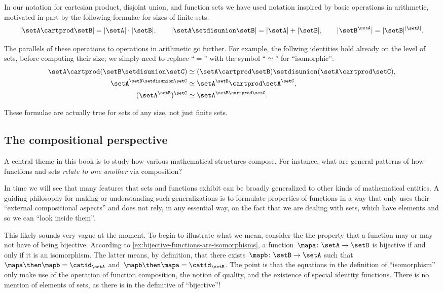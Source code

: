 In our notation for cartesian product, disjoint union, and function sets we have used notation inspired by basic operations in arithmetic, motivated in part by the following formulae for sizes of finite sets:
\begin{equation*}
    \vert \setA \cartprod \setB \vert = \vert \setA \vert \cdot \vert \setB \vert, \qquad \vert \setA \setdisunion \setB \vert = \vert \setA \vert + \vert \setB \vert, \qquad \vert \setB^{\setA} \vert = \vert \setB \vert^{\vert \setA \vert}.
\end{equation*}

The parallels of these operations to operations in arithmetic go further.
For example, the follwing identities hold already on the level of sets, before computing their size; we simply need to replace ``$=$'' with the symbol ``$\simeq$'' for ``isomorphic'':
\begin{align*}
    \setA \cartprod (\setB \setdisunion \setC) & \simeq (\setA \cartprod \setB) \setdisunion (\setA \cartprod \setC), \\
    \setA^{\setB \setdisunion \setC}           & \simeq \setA^\setB \cartprod \setA^\setC, \\
    (\setA^\setB)^\setC                        & \simeq \setA^{\setB \cartprod \setC}.
\end{align*}

These formulae are actually true for sets of any size, not just finite sets.

\subsection{The compositional perspective}

A central theme in this book is to study how various mathematical structures compose.
For instance, what are general patterns of how functions and sets \emph{relate to one another} via composition?

In time we will see that many features that sets and functions exhibit can be broadly generalized to other kinds of mathematical entities.
A guiding philosophy for making or understanding such generalizations is to formulate properties of functions in a way that only uses their ``external compositional aspects'' and does not rely, in any essential way, on the fact that we are dealing with sets, which have elements and so we can ``look inside them''.

This likely sounds very vague at the moment.
To begin to illustrate what we mean, consider the the property that a function may or may not have of being bijective.
According to \cref{ex:bijective-functions-are-isomorphisms}, a function~$\mapa\colon \setA \to \setB$ is bijective if and only if it is an isomorphism.
The latter means, by definition, that there exists~$\mapb \colon \setB \to \setA$ such that~$\mapa \then \mapb = \catid_\setA$ and~$\mapb \then \mapa = \catid_\setB$.
The point is that the equations in the definition of ``isomorphism'' only make use of the operation of function composition, the notion of quality, and the existence of special identity functions.
There is no mention of elements of sets, as there is in the definitive of ``bijective''!

